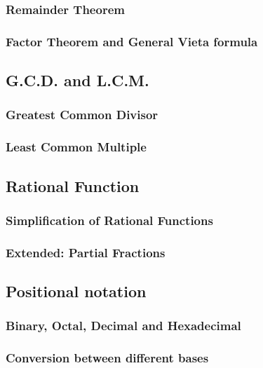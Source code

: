 \documentclass[12pt]{article}
\begin{document}
    \subsubsection*{Remainder Theorem}

    \subsubsection*{Factor Theorem and General Vieta formula}

    \subsection{G.C.D. and L.C.M.}

    \subsubsection*{Greatest Common Divisor}

    \subsubsection*{Least Common Multiple}

    \subsection{Rational Function}

    \subsubsection*{Simplification of Rational Functions}

    \subsubsection*{Extended: Partial Fractions}

    \subsection{Positional notation}

    \subsubsection*{Binary, Octal, Decimal and Hexadecimal}

    \subsubsection*{Conversion between different bases}
\end{document}
